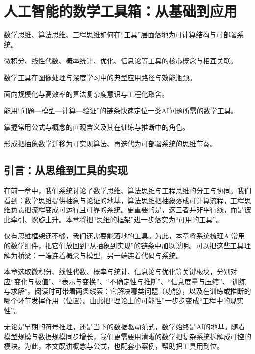 \chapter{人工智能的数学工具箱：从基础到应用}

\begin{introduction}[本章提要]
  \item 数学思维、算法思维、工程思维如何在“工具”层面落地为可计算结构与可部署系统。
  \item 微积分、线性代数、概率统计、优化、信息论等工具的核心概念与相互关联。
  \item 数学工具在图像处理与深度学习中的典型应用路径与效能瓶颈。
  \item 面向规模化与高效率的算法复杂度意识与工程化取舍。
\end{introduction}
\begin{introduction}[你将收获]
  \item 能用“问题—模型—计算—验证”的链条快速定位一类AI问题所需的数学工具。
  \item 掌握常用公式与概念的直观含义及其在训练与推断中的角色。
  \item 形成把抽象数学迁移为可实现算法、再迭代为可部署系统的思维节奏。
\end{introduction}

\section{引言：从思维到工具的实现}

在前一章中，我们系统讨论了数学思维、算法思维与工程思维的分工与协同。我们看到：数学思维提供抽象与论证的地基，算法思维把抽象落成可计算流程，工程思维负责把流程变成可运行且可靠的系统。更重要的是，这三者并非平行线，而是彼此牵引、螺旋上升。本章将把“思维的框架”进一步落实为“可用的工具”。

仅有思维框架还不够，我们还需要能落地的工具。为此，本章将系统梳理AI常用的数学组件，把它们放回到“从抽象到实现”的链条中加以说明。可以把这些工具理解为桥梁：一端连着概念与模型，另一端连着代码与系统。

本章选取微积分、线性代数、概率与统计、信息论与优化等关键板块，分别对应“变化与极值”、“表示与变换”、“不确定性与推断”、“信息度量与压缩”、“训练与求解”。阅读时可带着两条线索：它解决哪类问题（功能），以及在训练或推断的哪个环节发挥作用（位置）。由此把“理论上的可能性”一步步变成“工程中的现实性”。

无论是早期的符号推理，还是当下的数据驱动范式，数学始终是AI的地基。随着模型规模与数据规模同步增长，我们更需要用清晰的数学把复杂系统拆解成可控的模块。为此，本文既讲概念与公式，也配套小案例，帮助把工具用到位。

